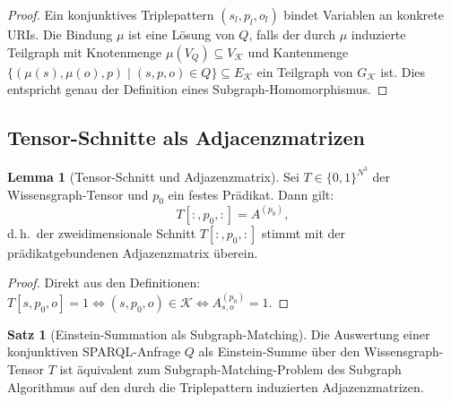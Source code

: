 ﻿\documentclass[a4paper,12pt]{article}
\theoremstyle{definition}
\newtheorem{satz}{Satz}
\newtheorem{lemma}{Lemma}
\begin{document}
\begin{proof}
Ein konjunktives Triplepattern $(s_l, p_l, o_l)$ bindet Variablen an konkrete URIs.
Die Bindung $\mu$ ist eine Lösung von $Q$, falls der durch $\mu$ induzierte Teilgraph
mit Knotenmenge $\mu(V_Q) \subseteq V_{\mathcal{K}}$ und Kantenmenge
$\{(\mu(s), \mu(o), p) \mid (s,p,o) \in Q\} \subseteq E_{\mathcal{K}}$ ein Teilgraph
von $G_{\mathcal{K}}$ ist. Dies entspricht genau der Definition eines
Subgraph-Homomorphismus.
\end{proof}

\subsection{Tensor-Schnitte als Adjacenzmatrizen}

\begin{lemma}[Tensor-Schnitt und Adjazenzmatrix]
\label{lem:tensor_adj}
Sei $T \in \{0,1\}^{N^3}$ der Wissensgraph-Tensor und $p_0$ ein festes Prädikat.
Dann gilt:
\[
  T[:,p_0,:] = A^{(p_0)},
\]
d.\,h.\ der zweidimensionale Schnitt $T[:,p_0,:]$ stimmt mit der prädikatgebundenen
Adjazenzmatrix überein.
\end{lemma}

\begin{proof}
Direkt aus den Definitionen: $T[s,p_0,o] = 1 \Leftrightarrow (s,p_0,o) \in \mathcal{K}
\Leftrightarrow A^{(p_0)}_{s,o} = 1$.
\end{proof}

\begin{satz}[Einstein-Summation als Subgraph-Matching]
\label{satz:einstein_subgraph}
Die Auswertung einer konjunktiven SPARQL-Anfrage $Q$ als Einstein-Summe über den
Wissensgraph-Tensor $T$ ist äquivalent zum Subgraph-Matching-Problem des
Subgraph Algorithmus auf den durch die Triplepattern induzierten Adjazenzmatrizen.
\end{satz}
\end{document}
